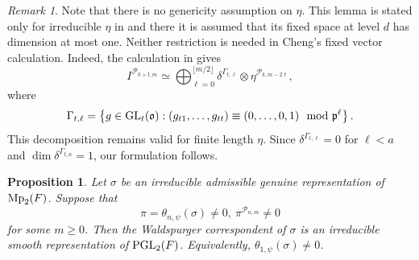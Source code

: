 \documentclass[12pt]{amsart}
\newtheorem{proposition}[theorem]{Proposition}
\theoremstyle{definition}
\theoremstyle{remark}
\newtheorem{remark}{Remark}
\begin{document}
\begin{remark}
Note that there is no genericity assumption on $\eta$. This lemma is stated only for irreducible $\eta$ in \cite[Lemma 6.1]{che26} and there it is assumed that its fixed space at level $d$ has dimension at most one. Neither restriction is needed in Cheng’s fixed vector calculation. Indeed, the calculation in \cite{che26} gives
\[
I^{\mathcal P_{k+t,m}}
\simeq
\bigoplus_{\ell=0}^{\lfloor m/2\rfloor}
\delta^{\Gamma_{t,\ell}}
\otimes
\eta^{\mathcal P_{k,m-2\ell}},
\]
where
\[
\Gamma_{t,\ell}
=
\left\{
g\in{\rm GL}_t(\mathfrak o):
(g_{t1},\ldots,g_{tt})
\equiv(0,\ldots,0,1)\mod{\mathfrak p^\ell}
\right\}.
\]
This decomposition remains valid for finite length $\eta$. Since $\delta^{\Gamma_{t,\ell}}=0$ for $\ell<a$ and $\dim\delta^{\Gamma_{t,a}}=1$, our formulation follows.
\end{remark}

\begin{proposition}\label{prop-split-source}
Let $\sigma$ be an irreducible admissible genuine representation of
${\rm Mp}_2(F)$. Suppose that
\[
\pi=\theta_{n,\psi}(\sigma)\neq 0,~
\pi^{\mathcal P_{n,m}}\neq 0
\]
for some $m\geq 0$. Then the Waldspurger correspondent of $\sigma$
is an irreducible smooth representation of  ${\rm PGL}_2(F)$. Equivalently,
$\theta_{1,\psi}(\sigma)\neq 0$.
\end{proposition}
\end{document}

